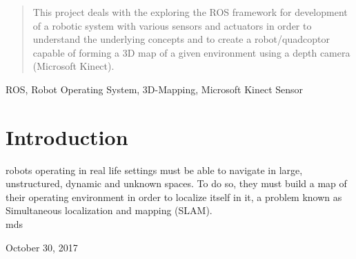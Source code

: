 \documentclass[journal]{IEEEtran}
\begin{document}




\maketitle

\begin{abstract}
This project deals with the exploring the ROS framework for development of a robotic system with various
sensors and actuators in order to understand the underlying concepts and to create a robot/quadcoptor
capable of forming a 3D map of a given environment using a depth camera (Microsoft Kinect).
\end{abstract}

\begin{IEEEkeywords}
ROS, Robot Operating System, 3D-Mapping, Microsoft Kinect Sensor
\end{IEEEkeywords}


%
\IEEEpeerreviewmaketitle


\section{Introduction}
 robots operating in real life settings must be able to navigate in large, unstructured, dynamic and unknown spaces. To do so, they must build a map of their operating environment in order to localize itself in it, a problem known as Simultaneous localization and mapping (SLAM). 
\\

\hfill mds
 
\hfill October 30, 2017

\end{document}
